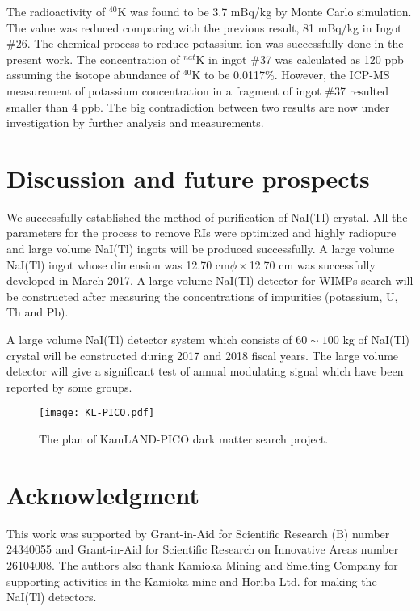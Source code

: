 \documentclass{jpsj-suppl} %
\begin{document}
The radioactivity of $^{40}$K was found to be 3.7 mBq/kg by Monte Carlo simulation.
The value was reduced comparing with the previous result, 81 mBq/kg in Ingot \#26.
The chemical process to reduce potassium ion was successfully done in the present work.
The concentration of $^{nat}$K in ingot \#37 was calculated as 120 ppb assuming 
the isotope abundance of $^{40}$K to be 0.0117\%.
However, the ICP-MS measurement of potassium concentration in a fragment of ingot \#37 
resulted smaller than 4 ppb.
The big contradiction between two results are now under investigation by further analysis 
and measurements.

\section{Discussion and future prospects}
We successfully established the method of purification of NaI(Tl) crystal.
All the parameters for the process to remove RIs were optimized and 
highly radiopure and large volume NaI(Tl) ingots will be produced successfully.
A large volume NaI(Tl) ingot whose dimension was 12.70 cm$\phi\times$12.70 cm 
was successfully developed in March 2017. 
A large volume NaI(Tl) detector for WIMPs search will be constructed after measuring 
the concentrations of impurities (potassium, U, Th and Pb).

A large volume NaI(Tl) detector system which consists of $60\sim100$ kg of NaI(Tl) crystal 
will be constructed during 2017 and 2018 fiscal years.
The large volume detector will give a significant test of annual modulating signal 
which have been reported by some groups.
\begin{figure}[ht]
\centering
\texttt{[image: KL-PICO.pdf]}
\caption{The plan of KamLAND-PICO dark matter search project.}
\label{fg:KL-PICO}
\end{figure}


\section*{Acknowledgment}
This work was supported by Grant-in-Aid for Scientific Research (B) number 24340055 and
Grant-in-Aid for Scientific Research on Innovative Areas number 26104008. 
The authors also thank Kamioka Mining and Smelting Company for supporting activities in the Kamioka mine and Horiba Ltd. for making the NaI(Tl) detectors. 
\end{document}
